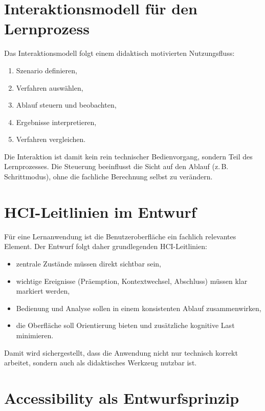 \section{Interaktionsmodell für den Lernprozess}

Das Interaktionsmodell folgt einem didaktisch motivierten Nutzungsfluss:

\begin{enumerate}
    \item Szenario definieren,
    \item Verfahren auswählen,
    \item Ablauf steuern und beobachten,
    \item Ergebnisse interpretieren,
    \item Verfahren vergleichen.
\end{enumerate}

Die Interaktion ist damit kein rein technischer Bedienvorgang, sondern Teil des Lernprozesses. Die Steuerung beeinflusst die Sicht auf den Ablauf (z.\,B. Schrittmodus), ohne die fachliche Berechnung selbst zu verändern.

\section{HCI-Leitlinien im Entwurf}

Für eine Lernanwendung ist die Benutzeroberfläche ein fachlich relevantes Element. Der Entwurf folgt daher grundlegenden HCI-Leitlinien:

\begin{itemize}
    \item zentrale Zustände müssen direkt sichtbar sein,
    \item wichtige Ereignisse (Präemption, Kontextwechsel, Abschluss) müssen klar markiert werden,
    \item Bedienung und Analyse sollen in einem konsistenten Ablauf zusammenwirken,
    \item die Oberfläche soll Orientierung bieten und zusätzliche kognitive Last minimieren.
\end{itemize}

Damit wird sichergestellt, dass die Anwendung nicht nur technisch korrekt arbeitet, sondern auch als didaktisches Werkzeug nutzbar ist.

\section{Accessibility als Entwurfsprinzip}

